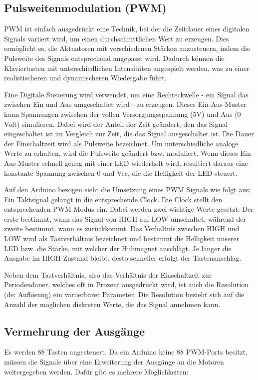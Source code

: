 \subsection{Pulsweitenmodulation (PWM)}\label{PWM}
PWM ist einfach ausgedrückt eine Technik, bei der die Zeitdauer eines digitalen Signals variiert wird, um einen
durchschnittlichen Wert zu erzeugen. Dies ermöglicht es, die Aktuatoren mit verschiedenen Stärken anzusteuern, indem die
Pulsweite des Signals
entsprechend angepasst wird. Dadurch können die Klaviertasten mit unterschiedlichen Intensitäten angespielt werden,
was zu einer realistischeren und dynamischeren Wiedergabe führt.\newline

Eine Digitale Steuerung wird verwendet, um eine Rechteckwelle - ein Signal das zwischen Ein und Aus umgeschaltet wird
- zu erzeugen. Dieses Ein-Aus-Muster kann Spannungen zwischen der vollen Versorgungsspannung (5V) und Aus (0 Volt)
simulieren.
Dabei wird der Anteil der Zeit geändert, den das Signal eingeschaltet ist im Vergleich zur Zeit, die das Signal
ausgeschaltet ist. Die Dauer der Einschaltzeit wird als Pulsweite bezeichnet. Um unterschiedliche analoge Werte zu
erhalten, wird die Pulsweite geändert bzw. moduliert. Wenn dieses Ein-Aus-Muster schnell genug mit einer LED
wiederholt wird, resultiert daraus eine konstante Spannung zwischen 0 und Vcc, die die Helligkeit
der LED steuert. \newline

Auf den Arduino bezogen sieht die Umsetzung eines PWM Signals wie folgt aus:
Ein Taktsignal gelangt in die entsprechende Clock.
Die Clock stellt den entsprechenden PWM-Modus ein. Dabei werden zwei wichtige Werte gesetzt:
Der erste bestimmt, wann das Signal von HIGH auf LOW
umschaltet, während der zweite bestimmt, wann es zurückkommt. Das Verhältnis zwischen HIGH und LOW wird als
Tastverhältnis bezeichnet und bestimmt die Helligkeit unserer LED bzw. die Stärke, mit welcher der Hubmagnet anschlägt.
Je länger die Ausgabe im HIGH-Zustand bleibt, desto schneller erfolgt der Tastenanschlag. \newline

Neben dem Tastverhältnis, also das Verhältnis der Einschaltzeit zur
Periodendauer, welches oft in Prozent ausgedrückt wird, ist auch die Resolution (de: Auflösung) ein variierbarer Parameter.
Die Resolution bezieht sich auf die Anzahl der möglichen diskreten Werte, die das Signal annehmen kann.



\subsection{Vermehrung der Ausgänge}
Es werden 88 Tasten angesteuert. Da ein Arduino keine 88 PWM-Ports besitzt, müssen die Signale über
eine Erweiterung der Ausgänge an die Motoren weitergegeben werden. Dafür gibt es mehrere Möglichkeiten:

